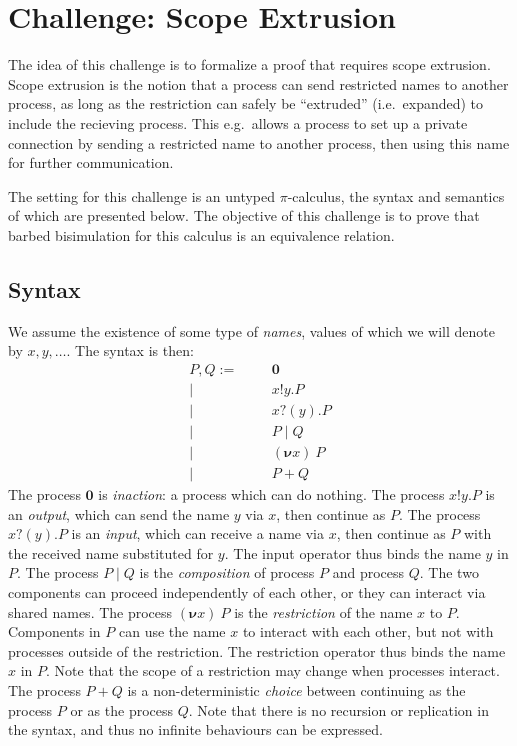 \documentclass[a4paper]{article}
\newcommand{\Pend}{\bm{0}}
\newcommand{\Ppar}[2]{#1 \mid #2}
\newcommand{\Pres}[2]{(\bm{\nu} #1)~#2}
\newcommand{\Pout}[3]{#1 ! #2 . #3}
\newcommand{\Pin}[3]{#1 ? (#2) . #3}
\newcommand{\Pchoice}[2]{#1 + #2}
\begin{document}
\section{Challenge: Scope Extrusion}
The idea of this challenge is to formalize a proof that requires scope extrusion.
Scope extrusion is the notion that a process can send restricted names to another process, as long as the restriction can safely be ``extruded'' (i.e.\ expanded) to include the recieving process.
This e.g.\ allows a process to set up a private connection by sending a restricted name to another process, then using this name for further communication.

The setting for this challenge is an untyped \( \pi \)-calculus, the syntax and semantics of which are presented below.
The objective of this challenge is to prove that barbed bisimulation for this calculus is an equivalence relation.

\subsection{Syntax}
We assume the existence of some type of \emph{names}, values of which we will denote by \( x, y, \dots \).
The syntax is then:
\begin{align*}
  P,Q :=&&& \Pend \\
  |&&& \Pout{x}{y}{P} \\
  |&&& \Pin{x}{y}{P} \\
  |&&& \Ppar{P}{Q} \\
  |&&& \Pres{x}{P} \\
  |&&& \Pchoice{P}{Q}
\end{align*}
The process \( \Pend \) is \emph{inaction}: a process which can do nothing.
The process \( \Pout{x}{y}{P} \) is an \emph{output}, which can send the name \( y \) via \( x \), then continue as \( P \).
The process \( \Pin{x}{y}{P} \) is an \emph{input}, which can receive a name via \( x \), then continue as \( P \) with the received name substituted for \( y \).
The input operator thus binds the name \( y \) in \( P \).
The process \( \Ppar{P}{Q} \) is the \emph{composition} of process \( P \) and process \( Q \).
The two components can proceed independently of each other, or they can interact via shared names.
The process \( \Pres{x}{P} \) is the \emph{restriction} of the name \( x \) to \( P \).
Components in \( P \) can use the name \( x \) to interact with each other, but not with processes outside of the restriction.
The restriction operator thus binds the name \( x \) in \( P \).
Note that the scope of a restriction may change when processes interact.
The process \( \Pchoice{P}{Q} \) is a non-deterministic \emph{choice} between continuing as the process \( P \) or as the process \( Q \).
Note that there is no recursion or replication in the syntax, and thus no infinite behaviours can be expressed.
\end{document}
